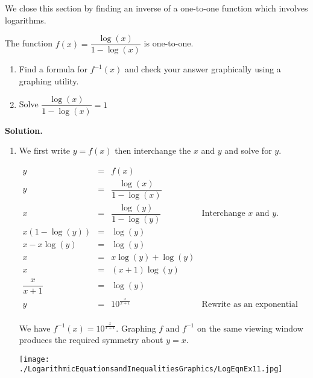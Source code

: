 \documentclass{ximera}
\begin{document}
\smallskip

We close this section by finding an inverse of a one-to-one function which involves logarithms.

\begin{example}  \label{logfracinverse} The function $f(x) = \dfrac{\log(x)}{1-\log(x)}$ is one-to-one. 

\begin{enumerate}

\item  Find a formula for $f^{-1}(x)$ and check your answer graphically using a graphing utility.

\item Solve  $\dfrac{\log(x)}{1-\log(x)} = 1$

\end{enumerate}

{\bf Solution.} \begin{enumerate} \item  We first write $y=f(x)$ then interchange the $x$ and $y$ and solve for $y$.

\[ \begin{array}{rclr}
y & = & f(x) & \\ 
y  & = & \dfrac{\log(x)}{1-\log(x)} & \\[8pt]
x  & = & \dfrac{\log(y)}{1-\log(y)} & \text{Interchange $x$ and $y$.}\\[8pt]
x\left(1-\log(y)\right) & = & \log(y) & \\ 
x - x\log(y)  & = & \log(y) & \\ 
x & = & x \log(y) + \log(y) & \\ 
x & = & (x+1) \log(y) & \\ 
\dfrac{x}{x+1}  & = & \log(y) & \\ 
y & = & 10^{\frac{x}{x+1}} & \text{Rewrite as an exponential equation.}\\

\end{array}\]



We have $f^{-1}(x) = 10^{\frac{x}{x+1}}$.  Graphing $f$ and $f^{-1}$ on the same viewing window produces the required symmetry about $y=x$.

\begin{center}

\texttt{[image: ./LogarithmicEquationsandInequalitiesGraphics/LogEqnEx11.jpg]}

\end{center}


\end{enumerate}
\end{example}
\end{document}
